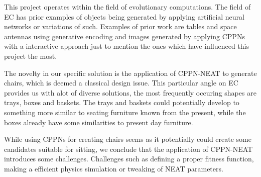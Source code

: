 This project operates within the field of evolutionary computations.
The field of EC has prior examples of objects being generated by applying artificial neural networks or variations of such.
Examples of prior work are tables and space antennas using generative encoding and images 
generated by applying CPPNs with a interactive approach just to mention the ones which have 
influenced this project the most.

The novelty in our specific solution is the application of CPPN-NEAT to generate chairs, which is deemed a classical design issue.
This particular angle on EC provides us with alot of diverse solutions, the most frequently occuring 
shapes are trays, boxes and baskets.
The trays and baskets could potentially develop to something more similar to seating furniture known 
from the present, while the boxes already have some similarities to present day furniture.

While using CPPNs for creating chairs seems as it potentially could create some candidates suitable 
for sitting, we conclude that the application of CPPN-NEAT introduces some challenges.
Challenges such as defining a proper fitness function, making a efficient physics simulation or 
tweaking of NEAT parameters.
